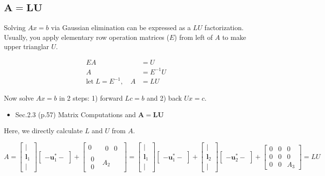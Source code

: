\documentclass[letterpaper]{article}
\begin{document}
\clearpage

\subsection{$\boldsymbol{A=LU}$}

Solving $Ax=b$  via Gaussian elimination can be expressed as a $LU$ factorization.
Usually, you apply elementary row operation matrices ($E$) from left of $A$ to make upper trianglar $U$.

\begin{align*}
  EA &= U\\
  A &= E^{-1}U\\
\text{let} \; L = E^{-1}, \quad  A &= LU
\end{align*}

Now solve $Ax=b$ in 2 steps: 1) forward $Lc=b$ and 2) back $Ux=c$.


\begin{itemize}
  \item Sec.2.3 (p.57) Matrix Computations and $\bm{A=LU}$
\end{itemize}

Here, we directly calculate $L$ and $U$ from $A$.

\begin{equation*}
  A = 
      \begin{bmatrix}
        |\\
        \bm{l}_1\\
        |
      \end{bmatrix}
      \begin{bmatrix}
        -  \bm{u}^*_1  -
      \end{bmatrix}
  +  \begin{bmatrix}
      0 & \begin{matrix} 0 & 0 \end{matrix}\\
      \begin{matrix} 0 \\ 0 \end{matrix} & A_2
    \end{bmatrix}
  = 
  \begin{bmatrix}
    |\\
    \bm{l}_1\\
    |
  \end{bmatrix}
  \begin{bmatrix}
    - \bm{u}^*_1 -
  \end{bmatrix}
  +
  \begin{bmatrix}
    |\\
    \bm{l}_2\\
    |
  \end{bmatrix}
  \begin{bmatrix}
    - \bm{u}^*_2  -
  \end{bmatrix}
  +  \begin{bmatrix}
  0 & 0 & 0\\
  0 & 0 & 0 \\
  0 & 0 & A_3
  \end{bmatrix} = LU
\end{equation*}
 
\end{document}
